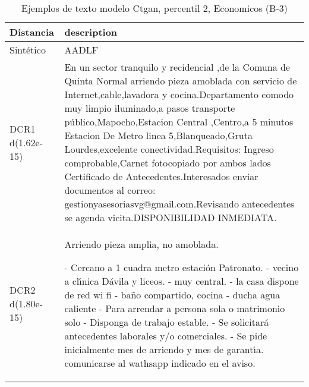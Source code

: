 \begin{table}[H]
\centering
\fontsize{10}{14}\selectfont
\caption{Ejemplos de texto modelo Ctgan, percentil 2, Economicos (B-3)}
\label{table-example-economicos-b-3-ctgan-2p-text}
\begin{tabular}{|l|m{35em}|}
\hline
\rowcolor[gray]{0.8}
Distancia & description \\
\hline Sintético & AADLF \\
\hline DCR1 d(1.62e-15) & En un sector tranquilo y recidencial ,de  la Comuna de Quinta Normal arriendo pieza amoblada con servicio de Internet,cable,lavadora y cocina.Departamento comodo muy limpio iluminado,a pasos transporte p\'ublico,Mapocho,Estacion Central ,Centro,a 5 minutos Estacion De Metro linea 5,Blanqueado,Gruta Lourdes,excelente conectividad.Requisitos: Ingreso comprobable,Carnet fotocopiado por ambos lados Certificado de Antecedentes.Interesados enviar documentos al correo: gestionyasesoriasvg@gmail.com.Revisando antecedentes  se agenda vicita.DISPONIBILIDAD INMEDIATA. \\
\hline DCR2 d(1.80e-15) &   Arriendo pieza amplia, no amoblada. 

- Cercano a 1 cuadra metro estaci\'on Patronato. 
- vecino a cl{\'\i}nica D\'avila y liceos. - muy central. - la casa dispone de red wi fi 
- ba\~no compartido, cocina 
- ducha agua caliente 
- Para arrendar a persona sola o matrimonio solo 
- Disponga de trabajo estable. 
- Se solicitar\'a antecedentes laborales y/o comerciales. 
- Se pide inicialmente mes de arriendo y mes de garant{\'\i}a. 
  comunicarse al wathsapp indicado en el aviso.
 \\
\hline
\end{tabular}
\end{table}
